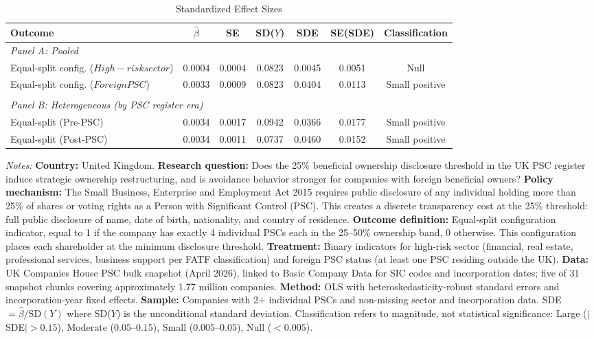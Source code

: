 \begin{table}[t]
\centering
\begin{threeparttable}
\caption{Standardized Effect Sizes}
\label{tab:sde}
\begin{adjustbox}{max width=\textwidth}
\begin{tabular}{lcccccc}
\toprule
Outcome & $\hat{\beta}$ & SE & SD($Y$) & SDE & SE(SDE) & Classification \\
\midrule
\multicolumn{7}{l}{\textit{Panel A: Pooled}} \\[3pt]
\quad Equal-split config. ($High-risk sector$) & 0.0004 & 0.0004 & 0.0823 & 0.0045 & 0.0051 & Null \\
\quad Equal-split config. ($Foreign PSC$) & 0.0033 & 0.0009 & 0.0823 & 0.0404 & 0.0113 & Small positive \\
\\
\multicolumn{7}{l}{\textit{Panel B: Heterogeneous (by PSC register era)}} \\[3pt]
\quad Equal-split (Pre-PSC) & 0.0034 & 0.0017 & 0.0942 & 0.0366 & 0.0177 & Small positive \\
\quad Equal-split (Post-PSC) & 0.0034 & 0.0011 & 0.0737 & 0.0460 & 0.0152 & Small positive \\
\bottomrule
\end{tabular}
\end{adjustbox}
\begin{tablenotes}[flushleft]\small
\item \textit{Notes:} \textbf{Country:} United Kingdom. \textbf{Research question:} Does the 25\% beneficial ownership disclosure threshold in the UK PSC register induce strategic ownership restructuring, and is avoidance behavior stronger for companies with foreign beneficial owners? \textbf{Policy mechanism:} The Small Business, Enterprise and Employment Act 2015 requires public disclosure of any individual holding more than 25\% of shares or voting rights as a Person with Significant Control (PSC). This creates a discrete transparency cost at the 25\% threshold: full public disclosure of name, date of birth, nationality, and country of residence. \textbf{Outcome definition:} Equal-split configuration indicator, equal to 1 if the company has exactly 4 individual PSCs each in the 25--50\% ownership band, 0 otherwise. This configuration places each shareholder at the minimum disclosure threshold. \textbf{Treatment:} Binary indicators for high-risk sector (financial, real estate, professional services, business support per FATF classification) and foreign PSC status (at least one PSC residing outside the UK). \textbf{Data:} UK Companies House PSC bulk snapshot (April 2026), linked to Basic Company Data for SIC codes and incorporation dates; five of 31 snapshot chunks covering approximately 1.77 million companies. \textbf{Method:} OLS with heteroskedasticity-robust standard errors and incorporation-year fixed effects. \textbf{Sample:} Companies with 2+ individual PSCs and non-missing sector and incorporation data. SDE $= \hat{\beta} / \text{SD}(Y)$ where SD($Y$) is the unconditional standard deviation. Classification refers to magnitude, not statistical significance: Large ($|$SDE$| > 0.15$), Moderate ($0.05$--$0.15$), Small ($0.005$--$0.05$), Null ($< 0.005$).

\end{tablenotes}
\end{threeparttable}
\end{table}
